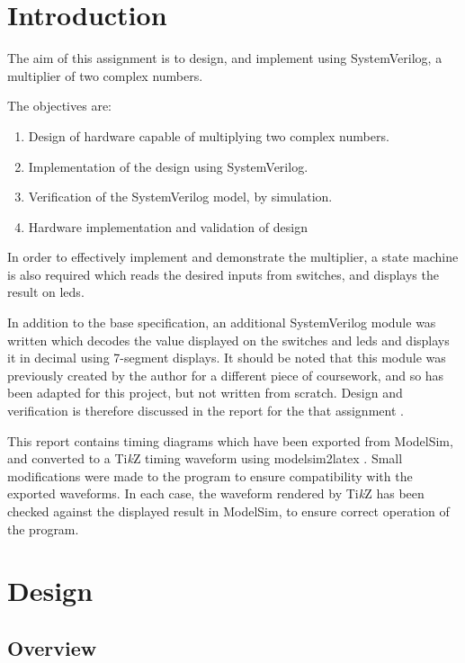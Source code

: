 \section{Introduction} \label{sec:intro}
The aim of this assignment is to design, and implement using SystemVerilog, a multiplier of two complex numbers.

The objectives are:
\begin{enumerate}
	\item Design of hardware capable of multiplying two complex numbers.
	\item Implementation of the design using SystemVerilog.
	\item Verification of the SystemVerilog model, by simulation.
	\item Hardware implementation and validation of design
\end{enumerate}

In order to effectively implement and demonstrate the multiplier, a state machine is also required which reads the desired inputs from switches, and displays the result on \glspl{led}.

In addition to the base specification, an additional SystemVerilog module was written which decodes the value displayed on the switches and \glspl{led} and displays it in decimal using 7-segment displays. It should be noted that this module was previously created by the author for a different piece of coursework, and so has been adapted for this project, but not written from scratch. Design and verification is therefore discussed in the report for the that assignment \cite{tyler2017}.

This report contains timing diagrams which have been exported from ModelSim, and converted to a Ti\textit{k}Z timing waveform using modelsim2latex \cite{show2016}. Small modifications were made to the program to ensure compatibility with the exported waveforms. In each case, the waveform rendered by Ti\textit{k}Z has been checked against the displayed result in ModelSim, to ensure correct operation of the program.

\FloatBarrier
\section{Design} \label{sec:design}

\subsection{Overview} \label{sec:design-overview}

